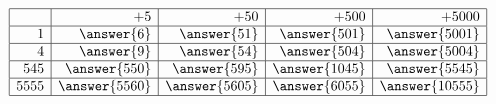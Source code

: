 \documentclass{ximera}
\begin{document}
\begin{problem}
$$\begin{array}{|r|r|r|r|r|}
\hline &+5 &+50 &+500 &+5000\\ 
\hline 1& \answer{6}& \answer{51}& \answer{501}& \answer{5001}\\ 
\hline 4& \answer{9}& \answer{54}& \answer{504}& \answer{5004}\\ 
\hline 545& \answer{550}& \answer{595}& \answer{1045}& \answer{5545}\\ 
\hline 5555& \answer{5560}& \answer{5605}& \answer{6055}& \answer{10555}\\ 
\hline
\end{array}
$$
\end{problem}
\end{document}
